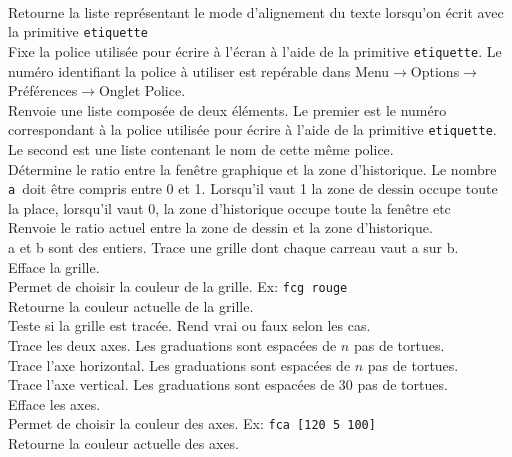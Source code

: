 \hspace{0cm}\\
Retourne la liste représentant le mode d'alignement du texte lorsqu'on écrit avec la primitive \texttt{etiquette}\\
Fixe la police utilisée pour écrire à l'écran à l'aide de la primitive \texttt{etiquette}. Le numéro identifiant la police à utiliser est repérable dans Menu$\to$Options$\to$Préférences$\to$Onglet Police.\\
Renvoie une liste composée de deux éléments. Le premier est le numéro correspondant à la police utilisée pour écrire à l'aide de la primitive \texttt{etiquette}. Le second est une liste contenant le nom de cette même police.\\
Détermine le ratio entre la fenêtre graphique et la zone d'historique. Le nombre \og \texttt{a}\fg \ doit être compris entre 0 et 1. Lorsqu'il vaut 1 la zone de dessin occupe toute la place, lorsqu'il vaut 0, la zone d'historique occupe toute la fenêtre etc\\
Renvoie le ratio actuel entre la zone de dessin et la zone d'historique.\\
a et b sont des entiers. Trace une grille dont chaque carreau vaut a sur b.\\
Efface la grille.\\
Permet de choisir la couleur de la grille. Ex: \texttt{fcg rouge}\\
Retourne la couleur actuelle de la grille.\\
Teste si la grille est tracée. Rend vrai ou faux selon les cas.\\
Trace les deux axes. Les graduations sont espacées de $n$ pas de tortues.\\
Trace l'axe horizontal. Les graduations sont espacées de $n$ pas de tortues.\\
Trace l'axe vertical. Les graduations sont espacées de 30 pas de tortues.\\
Efface les axes.\\
Permet de choisir la couleur des axes. Ex: \texttt{fca [120 5 100]} \\
Retourne la couleur actuelle des axes.\\
